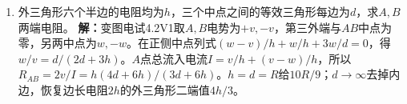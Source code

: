 \documentclass[UTF8,fontset=fandol,a4paper,11pt]{ctexart}
\begin{document}
\begin{enumerate}
\item 外三角形六个半边的电阻均为$h$，三个中点之间的等效三角形每边为$d$，求$A,B$两端电阻。
\textbf{解：}变图电试4.2V1取$A,B$电势为$+v,-v$，第三外端与$AB$中点为零，另两中点为$w,-w$。在正侧中点列式$(w-v)/h+w/h+3w/d=0$，得$w/v=d/(2d+3h)$。$A$点总流入电流$I=v/h+(v-w)/h$，所以$R_{AB}=2v/I=h(4d+6h)/(3d+6h)$。$h=d=R$给$10R/9$；$d\to\infty$去掉内边，恢复边长电阻$2h$的外三角形二端值$4h/3$。
\begin{center}\begin{minipage}{.98\linewidth}\centering
{}
\end{minipage}
\end{center}
\end{enumerate}
\end{document}

